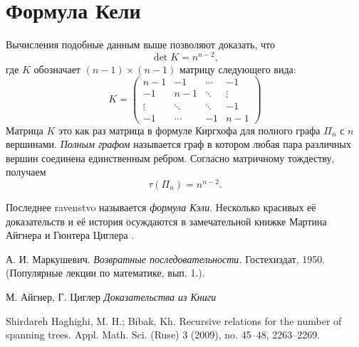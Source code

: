 \documentclass{article}
\begin{document}
\section{Формула Кели}

Вычисления подобные данным выше позволяют доказать, что
\[\det K=n^{n-2},\]
где $K$ обозначает $(n-1)\times (n-1)$ матрицу следующего вида:
\[
K=\left(
\begin{matrix}
n{-}1&-1&\cdots&-1
\\
-1&n{-}1&\ddots&\vdots
\\
\vdots&\ddots&\ddots&-1
\\
-1&\cdots&-1&n{-}1
\end{matrix}
\right)
\]
Матрица $K$ это как раз матрица в формуле Киргхофа для полного графа $\Pi_n$ с $n$ вершинами.
\emph{Полным графом} называется граф в котором любая пара различных вершин соединена единственным ребром.
Согласно матричному тождеству, получаем 
\[\tau(\Pi_n)=n^{n-2}.\]

Последнее ravenstvo называется \emph{формула Кэли}.
Несколько красивых её доказательств и её история осуждаются в замечательной книжке Мартина Айгнера и Гюнтера Циглера \cite[Глава 30]{aigner-ziegler}.

\begin{thebibliography}{52}
А. И. Маркушевич. 
\emph{Возвратные последовательности.} 
Гостехиздат, 1950. (Популярные лекции по математике, вып. 1.).

 М. Айгнер, Г. Циглер \emph{Доказательства из Книги}

 Shirdareh Haghighi, M. H.; Bibak, Kh.
Recursive relations for the number of spanning trees. 
Appl. Math. Sci. (Ruse) 3 (2009), no. 45--48, 2263--2269. 
\end{thebibliography}
\end{document}
